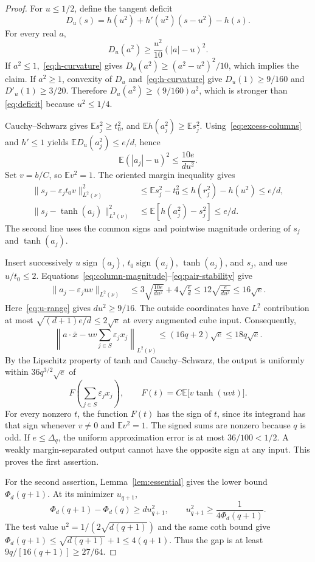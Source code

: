 \documentclass[11pt]{article}
\newcommand{\E}{\mathbb E}
\newcommand{\sgn}{\operatorname{sign}}
\begin{document}
\begin{proof}
For $u\le1/2$, define the tangent deficit
\[
 D_u(s)=h(u^2)+h'(u^2)(s-u^2)-h(s).
\]
For every real $a$,
\begin{equation}\label{eq:deficit}
 D_u(a^2)\ge\frac{u^2}{10}(|a|-u)^2.
\end{equation}
If $a^2\le1$,~\eqref{eq:h-curvature} gives
$D_u(a^2)\ge(a^2-u^2)^2/10$, which implies the claim.
If $a^2\ge1$, convexity of $D_u$ and~\eqref{eq:h-curvature} give
$D_u(1)\ge9/160$ and $D'_u(1)\ge3/20$.
Therefore $D_u(a^2)\ge(9/160)a^2$, which is stronger than
\eqref{eq:deficit} because $u^2\le1/4$.

Cauchy--Schwarz gives $\E s_j^2\ge t_0^2$, and
$\E h(a_j^2)\ge\E s_j^2$. Using~\eqref{eq:excess-columns} and
$h'\le1$ yields $\E D_u(a_j^2)\le e/d$, hence
\begin{equation}\label{eq:column-magnitude}
 \E(|a_j|-u)^2\le\frac{10e}{du^2}.
\end{equation}
Set $v=b/C$, so $\E v^2=1$. The oriented margin inequality gives
\begin{align}
 \|s_j-\varepsilon_jt_0v\|_{L^2(\nu)}^2
 &\le\E s_j^2-t_0^2\le h(r_j^2)-h(u^2)\le e/d,
 \label{eq:cs-stability}\\
 \|s_j-\tanh(a_j)\|_{L^2(\nu)}^2
 &\le\E[h(a_j^2)-s_j^2]\le e/d.
 \label{eq:pair-stability}
\end{align}
The second line uses the common signs and pointwise magnitude ordering
of $s_j$ and $\tanh(a_j)$.

Insert successively $u\sgn(a_j)$, $t_0\sgn(a_j)$,
$\tanh(a_j)$, and $s_j$, and use $u/t_0\le2$.
Equations~\eqref{eq:column-magnitude}--\eqref{eq:pair-stability} give
\begin{align*}
 \|a_j-\varepsilon_juv\|_{L^2(\nu)}
 &\le3\sqrt{\frac{10e}{du^2}}+4\sqrt{\frac ed}
 \le12\sqrt{\frac e{du^2}}\le16\sqrt e.
\end{align*}
Here~\eqref{eq:u-range} gives $du^2\ge9/16$.
The outside coordinates have $L^2$ contribution at most
$\sqrt{(d+1)e/d}\le2\sqrt e$ at every augmented cube input.
Consequently,
\[
 \left\|a\cdot\bar x-uv\sum_{j\in S}\varepsilon_jx_j\right\|_{L^2(\nu)}
 \le(16q+2)\sqrt e\le18q\sqrt e.
\]
By the Lipschitz property of tanh and Cauchy--Schwarz, the output
is uniformly within $36q^{3/2}\sqrt e$ of
\[
 F\!\left(\sum_{j\in S}\varepsilon_jx_j\right),\qquad
 F(t)=C\E\bigl[v\tanh(uvt)\bigr].
\]
For every nonzero $t$, the function $F(t)$ has the sign of $t$,
since its integrand has that sign whenever $v\ne0$ and $\E v^2=1$.
The signed sums are nonzero because $q$ is odd. If $e\le\Delta_q$,
the uniform approximation error is at most $36/100<1/2$.
A weakly margin-separated output cannot have the opposite sign
at any input. This proves the first assertion.

For the second assertion, Lemma~\ref{lem:essential} gives the lower
bound $\Phi_d(q+1)$. At its minimizer $u_{q+1}$,
\[
 \Phi_d(q+1)-\Phi_d(q)\ge d u_{q+1}^2,
 \qquad u_{q+1}^2\ge\frac1{4\Phi_d(q+1)}.
\]
The test value $u^2=1/(2\sqrt{d(q+1)})$ and the same coth bound give
$\Phi_d(q+1)\le\sqrt{d(q+1)}+1\le4(q+1)$.
Thus the gap is at least $9q/[16(q+1)]\ge27/64$.
\end{proof}
\end{document}
